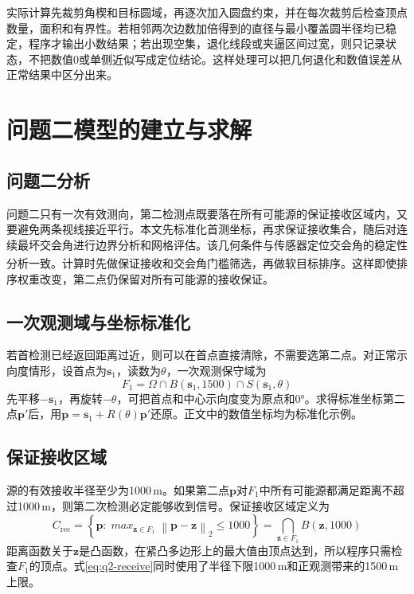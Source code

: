 \documentclass[UTF8,12pt,a4paper]{ctexart}
\newcommand{\vect}[1]{\boldsymbol{#1}}
\numberwithin{equation}{section}
\begin{document}
实际计算先裁剪角楔和目标圆域，再逐次加入圆盘约束，并在每次裁剪后检查顶点数量，面积和有界性。若相邻两次边数加倍得到的直径与最小覆盖圆半径均已稳定，程序才输出小数结果；若出现空集，退化线段或夹逼区间过宽，则只记录状态，不把数值0或单侧近似写成定位结论。这样处理可以把几何退化和数值误差从正常结果中区分出来。

\section{问题二模型的建立与求解}

\subsection{问题二分析}

问题二只有一次有效测向，第二检测点既要落在所有可能源的保证接收区域内，又要避免两条视线接近平行。本文先标准化首测坐标，再求保证接收集合，随后对连续最坏交会角进行边界分析和网格评估。该几何条件与传感器定位交会角的稳定性分析一致\textsuperscript{\normalfont\cite{bishop}}。计算时先做保证接收和交会角门槛筛选，再做软目标排序。这样即使排序权重改变，第二点仍保留对所有可能源的接收保证。

\subsection{一次观测域与坐标标准化}

若首检测已经返回距离过近，则可以在首点直接清除，不需要选第二点。对正常示向度情形，设首点为$\vect{s}_1$，读数为$\theta$，一次观测保守域为
\begin{equation}
F_1=\Omega\cap B(\vect{s}_1,1500)\cap S(\vect{s}_1,\theta)
\label{eq:q2-domain}
\end{equation}
先平移$-\vect{s}_1$，再旋转$-\theta$，可把首点和中心示向度变为原点和0°。求得标准坐标第二点$\vect{p}'$后，用$\vect{p}=\vect{s}_1+R(\theta)\vect{p}'$还原。正文中的数值坐标均为标准化示例。

\subsection{保证接收区域}

源的有效接收半径至少为1000\,m。如果第二点$\vect{p}$对$F_1$中所有可能源都满足距离不超过1000\,m，则第二次检测必定能够收到信号。保证接收区域定义为
\begin{equation}
C_{\mathrm{rec}}=\left\{\vect{p}:\mathop{\mathit{max}}_{\vect{z}\in F_1}\left\|\vect{p}-\vect{z}\right\|_2\leq1000\right\}=\bigcap_{\vect{z}\in F_1}B(\vect{z},1000)
\label{eq:q2-receive}
\end{equation}
距离函数关于$\vect{z}$是凸函数，在紧凸多边形上的最大值由顶点达到，所以程序只需检查$F_1$的顶点。式\eqref{eq:q2-receive}同时使用了半径下限1000\,m和正观测带来的1500\,m上限。
\end{document}
